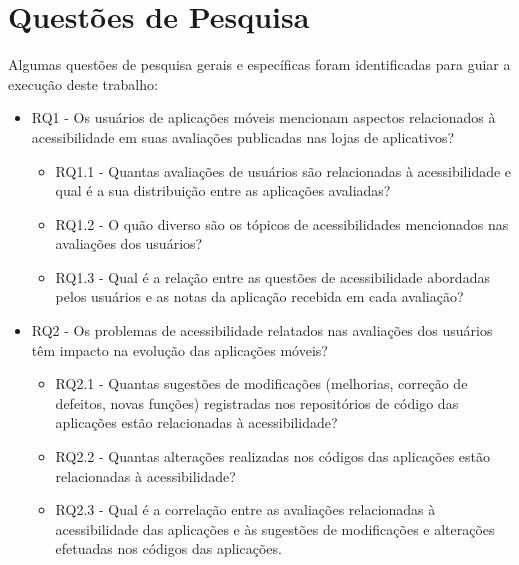


\section{Questões de Pesquisa}
\label{sec:questoespesquisa}

Algumas questões de pesquisa gerais e específicas foram identificadas para guiar a execução deste trabalho:
\begin{itemize}
 \item RQ1 - Os usuários de aplicações móveis mencionam aspectos relacionados à acessibilidade em suas avaliações publicadas nas lojas de aplicativos?
    \begin{itemize}
       \item RQ1.1 - Quantas avaliações de usuários são relacionadas à acessibilidade e qual é a sua distribuição entre as aplicações avaliadas?
       \item RQ1.2 - O quão diverso são os tópicos de acessibilidades mencionados nas avaliações dos usuários?
        \item RQ1.3 - Qual é a relação entre as questões de acessibilidade abordadas pelos usuários e as notas da aplicação recebida em cada avaliação?
 \end{itemize}
  \item RQ2 - Os problemas de acessibilidade relatados nas avaliações dos usuários têm impacto na evolução das aplicações móveis?
        \begin{itemize}
        \item RQ2.1 - Quantas sugestões de modificações (melhorias, correção de defeitos, novas funções) registradas nos repositórios de código das aplicações estão relacionadas à acessibilidade?
        \item RQ2.2 - Quantas alterações realizadas nos códigos das aplicações estão relacionadas à acessibilidade?
        \item RQ2.3 - Qual é a correlação entre as avaliações relacionadas à acessibilidade das aplicações e às sugestões de modificações e alterações efetuadas nos códigos das aplicações.
        \end{itemize}
\end{itemize}

